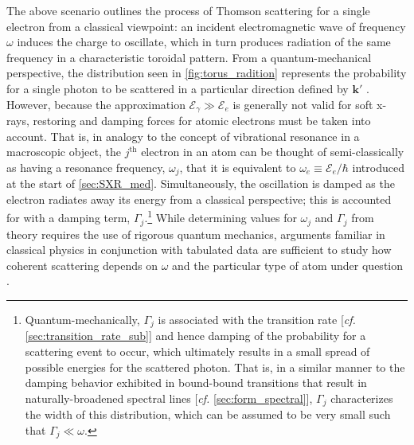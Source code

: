 The above scenario outlines the process of Thomson scattering for a single electron from a classical viewpoint: an incident electromagnetic wave of frequency $\omega$ induces the charge to oscillate, which in turn produces radiation of the same frequency in a characteristic toroidal pattern. 
From a quantum-mechanical perspective, the distribution seen in \cref{fig:torus_radition} represents the probability for a single photon to be scattered in a particular direction defined by $\mathbold{k}'$ \cite{Shankar04,deBergevin09,Attwood17,Als-Nielsen11}. 
However, because the approximation $\mathcal{E}_{\gamma} \gg \mathcal{E}_e$ is generally not valid for soft x-rays, restoring and damping forces for atomic electrons must be taken into account. 
That is, in analogy to the concept of vibrational resonance in a macroscopic object, the $j^{\text{th}}$ electron in an atom can be thought of semi-classically as having a resonance frequency, $\omega_j$, that it is equivalent to $\omega_e \equiv \mathcal{E}_{e} / \hbar$ introduced at the start of \cref{sec:SXR_med}. 
Simultaneously, the oscillation is damped as the electron radiates away its energy from a classical perspective; this is accounted for with a damping term, $\Gamma_j$.\footnote{Quantum-mechanically, $\Gamma_j$ is associated with the transition rate [\emph{cf.\@} \cref{sec:transition_rate_sub}] and hence damping of the probability for a scattering event to occur, which ultimately results in a small spread of possible energies for the scattered photon. 
That is, in a similar manner to the damping behavior exhibited in bound-bound transitions that result in naturally-broadened spectral lines [\emph{cf.\@} \cref{sec:form_spectral}], $\Gamma_j$ characterizes the width of this distribution, which can be assumed to be very small such that $\Gamma_j \ll \omega$.} 
While determining values for $\omega_j$ and $\Gamma_j$ from theory requires the use of rigorous quantum mechanics, arguments familiar in classical physics in conjunction with tabulated data are sufficient to study how coherent scattering depends on $\omega$ and the particular type of atom under question \cite{Shankar04,deBergevin09,Attwood17,Als-Nielsen11}. 

